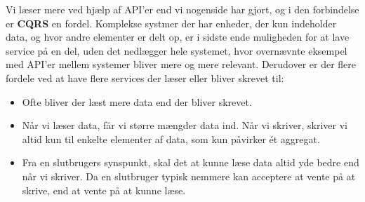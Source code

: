 Vi læser mere ved hjælp af API'er end vi nogenside har gjort, og i den forbindelse er \textbf{CQRS} en fordel. Komplekse systmer der har enheder, der kun indeholder data, og hvor andre elementer er delt op, er i sidste ende muligheden for at lave service på en del, uden det nedlægger hele systemet, hvor overnævnte eksempel med API'er mellem systemer bliver mere og mere relevant. 
Derudover er der flere fordele ved at have flere services der læser eller bliver skrevet til:\
\begin{itemize}
    \item Ofte bliver der læst mere data end der bliver skrevet.
    \item Når vi læser data, får vi større mængder data ind. Når vi skriver, skriver vi altid kun til enkelte elementer af data, som kun påvirker ét aggregat.
    \item Fra en slutbrugers synspunkt, skal det at kunne læse data altid yde bedre end når vi skriver. Da en slutbruger typisk nemmere kan acceptere at vente på at skrive, end at vente på at kunne læse.
\end{itemize}